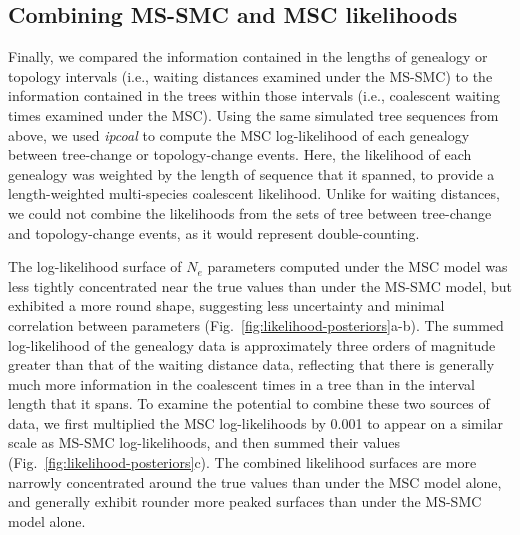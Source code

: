 \documentclass[11pt]{article}
\begin{document}
\subsection{Combining MS-SMC and MSC likelihoods}
Finally, we compared the information contained in the lengths of 
genealogy or topology intervals (i.e., waiting distances examined under the
MS-SMC) to the information contained in the trees within those intervals 
(i.e., coalescent waiting times examined under the MSC). 
Using the same simulated tree sequences from above, we used \emph{ipcoal} to
compute the MSC log-likelihood of each genealogy between tree-change or
topology-change events.
Here, the likelihood of each genealogy was weighted by the length of sequence
that it spanned, to provide a length-weighted multi-species coalescent
likelihood.%
Unlike for waiting distances, we could not combine the likelihoods 
from the sets of tree between tree-change and topology-change events,
as it would represent double-counting.

The log-likelihood surface of $N_e$ parameters computed under the MSC model
was less tightly concentrated near the true values than under the MS-SMC model,
but exhibited a more round shape, suggesting less uncertainty and minimal 
correlation between parameters 
(Fig.~\ref{fig:likelihood-posteriors}a-b).
The summed log-likelihood of the genealogy data is approximately three 
orders of magnitude greater than that of the waiting distance data,
reflecting that there is generally much more information in the coalescent 
times in a tree than in the interval length that it spans.
% 
To examine the potential to combine these two sources of data, we first 
multiplied the MSC log-likelihoods by 0.001 to appear on a similar scale
as MS-SMC log-likelihoods, and then summed their values
(Fig.~\ref{fig:likelihood-posteriors}c). The combined likelihood surfaces 
are more narrowly concentrated around the true values than under the 
MSC model alone, and generally exhibit rounder more peaked surfaces 
than under the MS-SMC model alone. 
\end{document}

